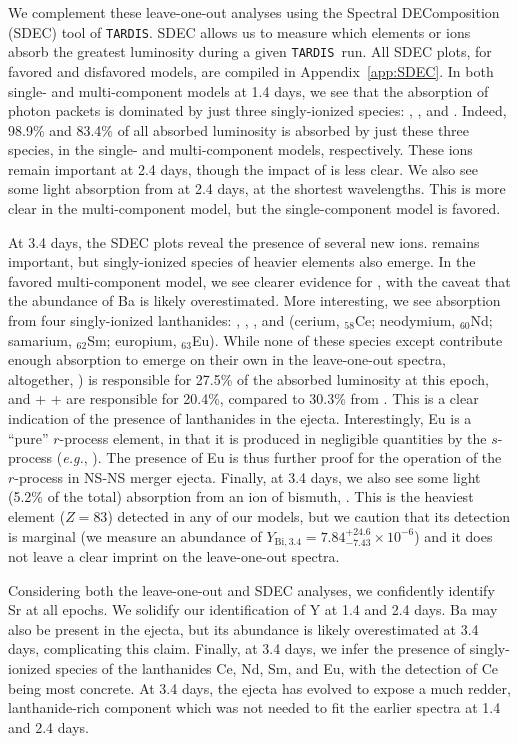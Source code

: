 \documentclass[twocolumn,twocolappendix]{aastex63}
\def\TARDIS{\texttt{TARDIS}}
\begin{document}
We complement these leave-one-out analyses using the Spectral DEComposition (SDEC) tool of \TARDIS. SDEC allows us to measure which elements or ions absorb the greatest luminosity during a given \TARDIS~run. All SDEC plots, for favored and disfavored models, are compiled in Appendix~\ref{app:SDEC}. In both single- and multi-component models at 1.4 days, we see that the absorption of photon packets is dominated by just three singly-ionized species: , , and . Indeed, 98.9\% and 83.4\% of all absorbed luminosity is absorbed by just these three species, in the single- and multi-component models, respectively. These ions remain important at 2.4 days, though the impact of  is less clear. We also see some light absorption from  at 2.4 days, at the shortest wavelengths. This is more clear in the multi-component model, but the single-component model is favored.

At 3.4 days, the SDEC plots reveal the presence of several new ions.  remains important, but singly-ionized species of heavier elements also emerge. In the favored multi-component model, we see clearer evidence for , with the caveat that the abundance of Ba is likely overestimated. More interesting, we see absorption from four singly-ionized lanthanides: , , , and  (cerium, ${}_{58}$Ce; neodymium, ${}_{60}$Nd; samarium, ${}_{62}$Sm; europium, ${}_{63}$Eu). While none of these species except  contribute enough absorption to emerge on their own in the leave-one-out spectra, altogether, ) is responsible for 27.5\% of the absorbed luminosity at this epoch, and  +  +  are responsible for 20.4\%, compared to 30.3\% from . This is a clear indication of the presence of lanthanides in the ejecta. Interestingly, Eu is a ``pure'' $r$-process element, in that it is produced in negligible quantities by the $s$-process (\textit{e.g.}, \citealt{bisterzo14}). The presence of Eu is thus further proof for the operation of the $r$-process in NS-NS merger ejecta. Finally, at 3.4 days, we also see some light (5.2\% of the total) absorption from an ion of bismuth, . This is the heaviest element ($Z=83$) detected in any of our models, but we caution that its detection is marginal (we measure an abundance of $Y_{\mathrm{Bi},3.4} = 7.84^{+24.6}_{-7.43} \times 10^{-6}$) and it does not leave a clear imprint on the leave-one-out spectra. 

Considering both the leave-one-out and SDEC analyses, we confidently identify Sr at all epochs. We solidify our identification of Y at 1.4 and 2.4 days. Ba may also be present in the ejecta, but its abundance is likely overestimated at 3.4 days, complicating this claim. Finally, at 3.4 days, we infer the presence of singly-ionized species of the lanthanides Ce, Nd, Sm, and Eu, with the detection of Ce being most concrete. At 3.4 days, the ejecta has evolved to expose a much redder, lanthanide-rich component which was not needed to fit the earlier spectra at 1.4 and 2.4 days.
\end{document}
